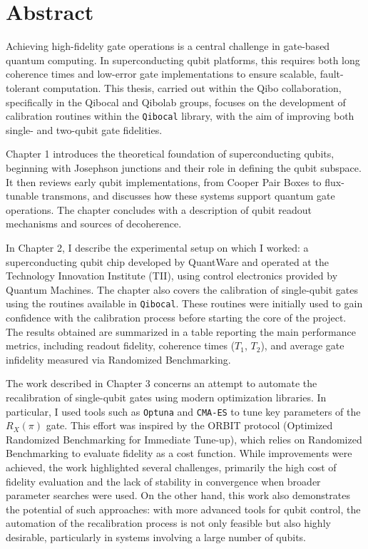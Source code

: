 \chapter{Abstract}
Achieving high-fidelity gate operations is a central challenge in gate-based quantum computing. In superconducting qubit platforms, this requires both long coherence times and low-error gate implementations to ensure scalable, fault-tolerant computation.
This thesis, carried out within the Qibo collaboration, specifically in the Qibocal and Qibolab groups, focuses on the development of calibration routines within the \texttt{Qibocal} library, with the aim of improving both single- and two-qubit gate fidelities.

Chapter 1 introduces the theoretical foundation of superconducting qubits, beginning with Josephson junctions and their role in defining the qubit subspace. 
It then reviews early qubit implementations, from Cooper Pair Boxes to flux-tunable transmons, and discusses how these systems support quantum gate operations. 
The chapter concludes with a description of qubit readout mechanisms and sources of decoherence.

In Chapter 2, I describe the experimental setup on which I worked: a superconducting qubit chip developed by QuantWare and operated at the Technology Innovation Institute (TII), using control electronics provided by Quantum Machines. 
The chapter also covers the calibration of single-qubit gates using the routines available in \texttt{Qibocal}. 
These routines were initially used to gain confidence with the calibration process before starting the core of the project. 
The results obtained are summarized in a table reporting the main performance metrics, including readout fidelity, coherence times ($T_1$, $T_2$), and average gate infidelity measured via Randomized Benchmarking.

The work described in Chapter 3 concerns an attempt to automate the recalibration of single-qubit gates using modern optimization libraries. 
In particular, I used tools such as \texttt{Optuna} and \texttt{CMA-ES} to tune key parameters of the $R_X(\pi)$ gate. 
This effort was inspired by the ORBIT protocol (Optimized Randomized Benchmarking for Immediate Tune-up), which relies on Randomized Benchmarking to evaluate fidelity as a cost function. 
While improvements were achieved, the work highlighted several challenges, primarily the high cost of fidelity evaluation and the lack of stability in convergence when broader parameter searches were used.
On the other hand, this work also demonstrates the potential of such approaches: with more advanced tools for qubit control, the automation of the recalibration process is not only feasible but also highly desirable, particularly in systems involving a large number of qubits.

